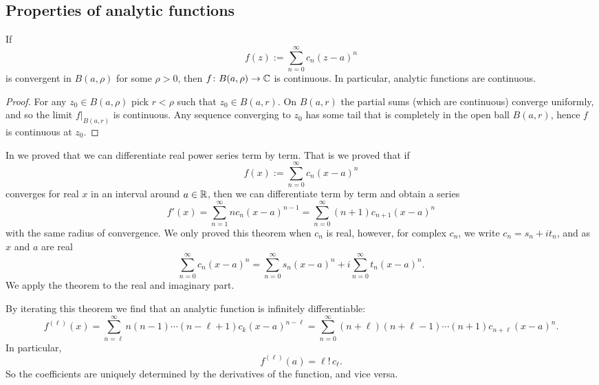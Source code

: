 \subsection{Properties of analytic functions}

\begin{prop}
If
\begin{equation*}
f(z) := \sum_{n=0}^\infty c_n {(z-a)}^n
\end{equation*}
is convergent in $B(a,\rho)$ for some $\rho > 0$, then
$f \colon B(a,\rho) \to {\mathbb{C}}$ is continuous.
In particular, analytic functions are continuous.
\end{prop}

\begin{proof}
For any $z_0 \in B(a,\rho)$ pick $r < \rho$ such that $z_0 \in B(a,r)$.
On $B(a,r)$ the
partial sums (which are continuous) converge uniformly,
and so the limit $f|_{B(a,r)}$ is continuous.
Any sequence converging to
$z_0$ has some tail that is completely in the open ball $B(a,r)$,
hence $f$ is continuous at $z_0$.
\end{proof}

In  we proved that we can
differentiate real power series term by term.  That is
we proved that if
\begin{equation*}
f(x) := \sum_{n=0}^\infty c_n {(x-a)}^n
\end{equation*}
converges for real $x$ in an interval around $a \in {\mathbb{R}}$, then we can differentiate
term by term and obtain a series
\begin{equation*}
f'(x) =
\sum_{n=1}^\infty n c_n {(x-a)}^{n-1}
=
\sum_{n=0}^\infty (n+1)c_{n+1} {(x-a)}^{n} 
\end{equation*}
with the same radius of convergence.
We only proved this theorem when $c_n$ is real, however, for complex $c_n$,
we write
$c_n = s_n + i t_n$, and as $x$ and $a$ are real
\begin{equation*}
\sum_{n=0}^\infty c_n {(x-a)}^n
=
\sum_{n=0}^\infty s_n {(x-a)}^n
+
i
\sum_{n=0}^\infty t_n {(x-a)}^n .
\end{equation*}
We apply the theorem to the real and
imaginary part.

By iterating this theorem we find that an
analytic function is infinitely differentiable:
\begin{equation*}
f^{(\ell)}(x) =
\sum_{n=\ell}^\infty n(n-1)\cdots(n-\ell+1)c_k {(x-a)}^{n-\ell}
=
\sum_{n=0}^\infty (n+\ell)(n+\ell-1)\cdots (n+1) c_{n+\ell} {(x-a)}^{n} .
\end{equation*}
In particular,
\begin{equation} \label{eq:formulaforpscoeffs}
f^{(\ell)}(a) = \ell! \, c_\ell .
\end{equation}
So the coefficients are uniquely determined by the derivatives of the
function, and vice versa.

